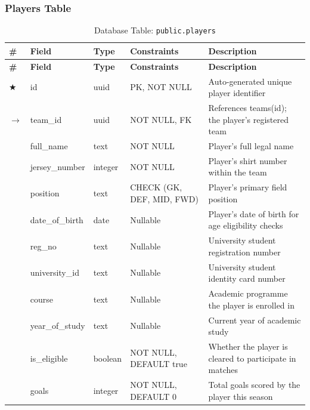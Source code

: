 \documentclass[12pt,a4paper]{report}
\begin{document}
\subsubsection{Players Table}
\setlength{\tabcolsep}{4pt}
\begin{longtable}{p{0.4cm}p{3.5cm}p{2.3cm}p{3.0cm}p{4.5cm}}
\caption{Database Table: \texttt{public.players}}\\
\rowcolor[HTML]{003087}
{\color{white}\textbf{\#}} &
{\color{white}\textbf{Field}} &
{\color{white}\textbf{Type}} &
{\color{white}\textbf{Constraints}} &
{\color{white}\textbf{Description}} \\
\endfirsthead
\rowcolor[HTML]{003087}
{\color{white}\textbf{\#}} &
{\color{white}\textbf{Field}} &
{\color{white}\textbf{Type}} &
{\color{white}\textbf{Constraints}} &
{\color{white}\textbf{Description}} \\
\endhead
\rowcolor[HTML]{EEF2FF}
$\bigstar$ & id & uuid & PK, NOT NULL & Auto-generated unique player identifier \\
\rowcolor[HTML]{FFFFFF}
$\to$ & team\_id & uuid & NOT NULL, FK & References teams(id); the player's registered team \\
\rowcolor[HTML]{EEF2FF}
 & full\_name & text & NOT NULL & Player's full legal name \\
\rowcolor[HTML]{FFFFFF}
 & jersey\_number & integer & NOT NULL & Player's shirt number within the team \\
\rowcolor[HTML]{EEF2FF}
 & position & text & CHECK (GK, DEF, MID, FWD) & Player's primary field position \\
\rowcolor[HTML]{FFFFFF}
 & date\_of\_birth & date & Nullable & Player's date of birth for age eligibility checks \\
\rowcolor[HTML]{EEF2FF}
 & reg\_no & text & Nullable & University student registration number \\
\rowcolor[HTML]{FFFFFF}
 & university\_id & text & Nullable & University student identity card number \\
\rowcolor[HTML]{EEF2FF}
 & course & text & Nullable & Academic programme the player is enrolled in \\
\rowcolor[HTML]{FFFFFF}
 & year\_of\_study & text & Nullable & Current year of academic study \\
\rowcolor[HTML]{EEF2FF}
 & is\_eligible & boolean & NOT NULL, DEFAULT true & Whether the player is cleared to participate in matches \\
\rowcolor[HTML]{FFFFFF}
 & goals & integer & NOT NULL, DEFAULT 0 & Total goals scored by the player this season \\

\end{longtable}
\end{document}
